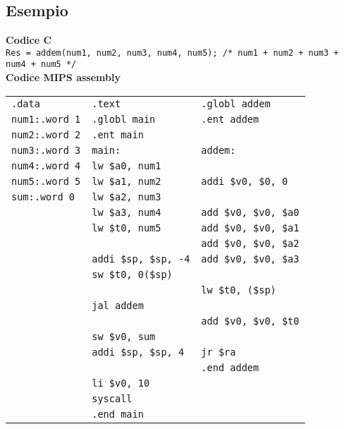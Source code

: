 \documentclass[../main.tex]{subfiles}
\begin{document}
\subsection*{Esempio}
\textbf{Codice C} \\
\texttt{Res = addem(num1, num2, num3, num4, num5);
/* num1 + num2 + num3 + num4 + num5 */} \\[5mm]
\textbf{Codice MIPS assembly}
\begin{table}[h!]
    \setlength{\tabcolsep}{30pt}
    \begin{tabular}{ l | l | l }
        \texttt{.data} & \texttt{.text} & \texttt{.globl addem} \\
        \texttt{num1:\hspace{2.1mm}.word 1} & \texttt{.globl main} & \texttt{.ent addem} \\
        \texttt{num2:\hspace{2.1mm}.word 2} & \texttt{.ent main} \\
        \texttt{num3:\hspace{2.1mm}.word 3} & \texttt{main:} & \texttt{addem:} \\
        \texttt{num4:\hspace{2.1mm}.word 4} & \texttt{lw \$a0, num1} \\
        \texttt{num5:\hspace{2.1mm}.word 5} & \texttt{lw \$a1, num2} & \texttt{addi \$v0, \$0, 0} \\
        \texttt{sum:\hspace{4.2mm}.word 0} & \texttt{lw \$a2, num3} \\
        & \texttt{lw \$a3, num4} & \texttt{add \$v0, \$v0, \$a0} \\
        & \texttt{lw \$t0, num5} & \texttt{add \$v0, \$v0, \$a1} \\
        & & \texttt{add \$v0, \$v0, \$a2} \\
        & \texttt{addi \$sp, \$sp, -4} & \texttt{add \$v0, \$v0, \$a3} \\
        & \texttt{sw \$t0, 0(\$sp)} \\
        & & \texttt{lw \$t0, (\$sp)} \\
        & \texttt{jal addem} \\
        & & \texttt{add \$v0, \$v0, \$t0} \\
        & \texttt{sw \$v0, sum} \\
        & \texttt{addi \$sp, \$sp, 4} & \texttt{jr \$ra} \\
        & & \texttt{.end addem} \\
        & \texttt{li \$v0, 10} \\
        & \texttt{syscall} \\
        & \texttt{.end main} \\
    \end{tabular}
\end{table}
\end{document}
